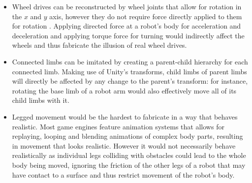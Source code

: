 \begin{itemize}
    \item Wheel drives can be reconstructed by wheel joints that allow for rotation in the $x$ and $y$ axis, however they do not require force directly applied to them for rotation . Applying directed force at a robot's body for acceleration and deceleration and applying torque force for turning would indirectly affect the wheels and thus fabricate the illusion of real wheel drives. 
    \item Connected limbs can be imitated by creating a parent-child hierarchy for each connected limb. Making use of Unity's transforms, child limbs of parent limbs will directly be affected by any change to the parent's transform: for instance, rotating the base limb of a robot arm would also effectively move all of its child limbs with it.
    \item Legged movement would be the hardest to fabricate in a way that behaves realistic. Most game engines feature animation systems that allows for replaying, looping and blending animations of complex body parts, resulting in movement that looks realistic. However it would not necessarily behave realistically as individual legs colliding with obstacles could lead to the whole body being moved, ignoring the friction of the other legs of a robot that may have contact to a surface and thus restrict movement of the robot's body.
\end{itemize}

